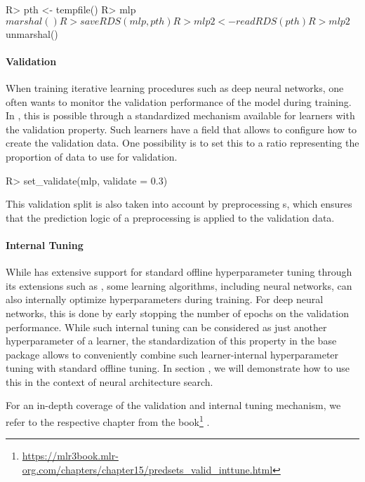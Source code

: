 \documentclass[article]{jss}
\theoremstyle{definition}
\begin{document}
\begin{CodeInput}
R> pth <- tempfile()
R> mlp$marshal()
R> saveRDS(mlp, pth)
R> mlp2 <- readRDS(pth)
R> mlp2$unmarshal()
\end{CodeInput}

\paragraph{Validation}

When training iterative learning procedures such as deep neural networks, one often wants to monitor the validation performance of the model during training.
In , this is possible through a standardized mechanism available for learners with the validation property.
Such learners have a  field that allows to configure how to create the validation data.
One possibility is to set this to a ratio representing the proportion of data to use for validation.

\begin{CodeInput}
R> set_validate(mlp, validate = 0.3)
\end{CodeInput}

This validation split is also taken into account by preprocessing s, which ensures that the prediction logic of a preprocessing  is applied to the validation data.

\paragraph{Internal Tuning}

While \mlrt{} has extensive support for standard offline hyperparameter tuning through its extensions such as  \citep{ref-mlr3tuning2024}, some learning algorithms, including neural networks, can also internally optimize hyperparameters during training.
For deep neural networks, this is done by early stopping the number of epochs on the validation performance.
While such internal tuning can be considered as just another hyperparameter of a learner, the standardization of this property in the \mlrt{} base package allows to conveniently combine such learner-internal hyperparameter tuning with standard offline tuning.
In section , we will demonstrate how to use this in the context of neural architecture search.

For an in-depth coverage of the validation and internal tuning mechanism, we refer to the respective chapter from the  book\footnote{\url{https://mlr3book.mlr-org.com/chapters/chapter15/predsets\_valid\_inttune.html}} \citep{ref-mlr3book-valid}.
\end{document}
